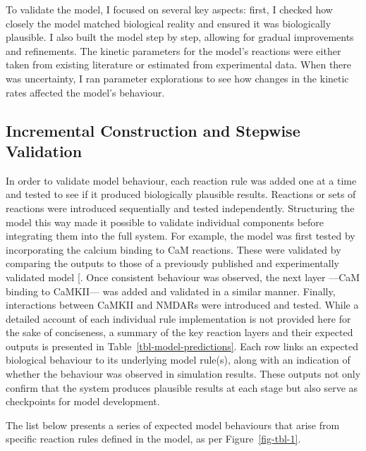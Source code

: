 \documentclass[
  11pt,
  letterpaper,
]{scrreprt}
\begin{document}
To validate the model, I focused on several key aspects: first, I
checked how closely the model matched biological reality and ensured it
was biologically plausible. I also built the model step by step,
allowing for gradual improvements and refinements. The kinetic
parameters for the model's reactions were either taken from existing
literature or estimated from experimental data. When there was
uncertainty, I ran parameter explorations to see how changes in the
kinetic rates affected the model's behaviour.

\subsection{Incremental Construction and Stepwise
Validation}\label{incremental-construction-and-stepwise-validation}

In order to validate model behaviour, each reaction rule was added one
at a time and tested to see if it produced biologically plausible
results. Reactions or sets of reactions were introduced sequentially and
tested independently. Structuring the model this way made it possible to
validate individual components before integrating them into the full
system. For example, the model was first tested by incorporating the
calcium binding to CaM reactions. These were validated by comparing the
outputs to those of a previously published and experimentally validated
model {[}\citeproc{ref-romangarcia2017Computationala}{472}{]}. Once
consistent behaviour was observed, the next layer ---CaM binding to
CaMKII--- was added and validated in a similar manner. Finally,
interactions between CaMKII and NMDARs were introduced and tested. While
a detailed account of each individual rule implementation is not
provided here for the sake of conciseness, a summary of the key reaction
layers and their expected outputs is presented in
Table~\ref{tbl-model-predictions}. Each row links an expected biological
behaviour to its underlying model rule(s), along with an indication of
whether the behaviour was observed in simulation results. These outputs
not only confirm that the system produces plausible results at each
stage but also serve as checkpoints for model development.

The list below presents a series of expected model behaviours that arise
from specific reaction rules defined in the model, as per
Figure~\ref{fig-tbl-1}.
\end{document}

